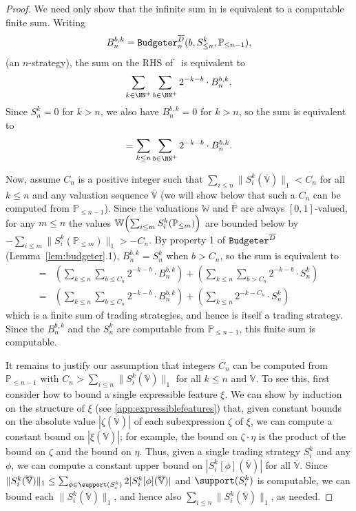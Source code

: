 \documentclass[authordate,onecolumn,noenvironments]{miri-tech-article}
\numberwithin{equation}{subsection}
\newcommand{\seq}[1]{{\overline{#1}}}
\newcommand{\mm}{m}
\newcommand{\nn}{n}
\newcommand{\budgeter}{\text{\upshape{\texttt{Budgeter}}}\xspace}
\newcommand{\BelState}{\mathbb{P}}
\newcommand{\Valuation}{\mathbb{V}}
\newcommand{\pt}{\BelState}
\newcommand{\MP}{\seq{\pt}}
\newcommand{\dt}{D}
\newcommand{\DP}{\seq{\dt}}
\newcommand{\World}{\mathbb{W}}
\begin{document}
\begin{proof}
We need only show that the infinite sum in  is equivalent to a computable finite sum.  
Writing 
\[B^{b,k}_\nn = \budgeter^\DP_\nn(b,S^k_{\leq n} ,\pt_{\le \nn-1}),
\]
(an $n$-strategy), the sum on the RHS of~ is equivalent to
\[
\sum_{k\in\NN^+}\sum_{b\in\NN^+} 2^{-k-b}\cdot B^{b,k}_\nn .
\]
Since $S^k_\nn = 0$ for $k>\nn$, we also have $B^{b,k}_\nn=0$ for $k>\nn$, so the sum is equivalent to
\[
=\sum_{k\leq n}\sum_{b\in\NN^+} 2^{-k-b}\cdot B^{b,k}_\nn .
\]

Now, assume $C_n$ is a positive integer such that $\sum_{i \leq \nn}\|S^k_i(\seq\Valuation)\|_1<C_n$ for all $k \leq  \nn$ and any valuation sequence $\seq\Valuation$ (we will show below that such a $C_n$ can be computed from $\pt_{\le \nn-1}$). Since the valuations $\World$ and $\MP$ are always $[0,1]$-valued, for any $m \leq n$ the values $ \World\mleft(\sum_{i\leq m}S^k_i(\pt_{\leq m})\mright) $ are bounded below by $-\sum_{i \leq \mm}\|S^k_i(\pt_{\leq m})\|_1>-C_n$.   By property 1 of $\budgeter^\DP$  (Lemma~\ref{lem:budgeter}.1), $B^{b,k}_\nn = S^k_\nn$ when $b > C_n$, so the sum is equivalent to
\begin{align*}
  =& \left(\sum_{k\leq n}\sum_{b \leq C_n}2^{-k-b}\cdot B^{b,k}_\nn\right)+\left(\sum_{k\leq n}\sum_{b> C_n}2^{-k-b}\cdot S^k_\nn\right)\\
  =& \left(\sum_{k\leq n}\sum_{b \leq C_n}2^{-k-b}\cdot B^{b,k}_\nn\right)+\left(\sum_{k\leq n}2^{-k-C_n}\cdot S^k_\nn\right)
\end{align*}
which is a finite sum of trading strategies, and hence is itself a trading strategy. 
Since the $B^{b,k}_\nn$ and the $S^k_\nn$ are computable from $\pt_{\le \nn-1}$, this finite sum is computable.

It remains to justify our assumption that integers $C_n$ can be computed from $\pt_{\le \nn-1}$ with  $C_n>\sum_{i \leq \nn}\|S^k_i(\seq\Valuation)\|_1$ for all $k \leq \nn$ and  $\seq\Valuation$.  To see this, first consider how to bound a single expressible feature $\xi$. We can show by induction on the structure of $\xi$ (see \ref{app:expressiblefeatures}) that, given constant  bounds on the absolute value $|\zeta(\seq\Valuation)|$ of each subexpression $\zeta$ of $\xi$, we can compute a constant bound on $|\xi(\seq\Valuation)|$; for example, the bound on $\zeta \cdot \eta$ is the product of the bound on $\zeta$ and the bound on $\eta$. Thus, given a single trading strategy $S^k_i$ and any $\phi$, we can compute a constant upper bound on $|S^k_i[\phi](\seq\Valuation)|$ for all $\seq\Valuation$. Since $\|S^k_i(\seq\Valuation)\|_1 \leq \sum_{\phi \in \support(S^k_i)} 2 |S^k_i[\phi](\seq\Valuation)|$ and $\support(S^k_i)$ is computable, we can bound each $\|S^k_i(\seq\Valuation)\|_1$, and hence also $\sum_{i \leq \nn}\|S^k_i(\seq\Valuation)\|_1$, as needed.

\end{proof}
\end{document}
